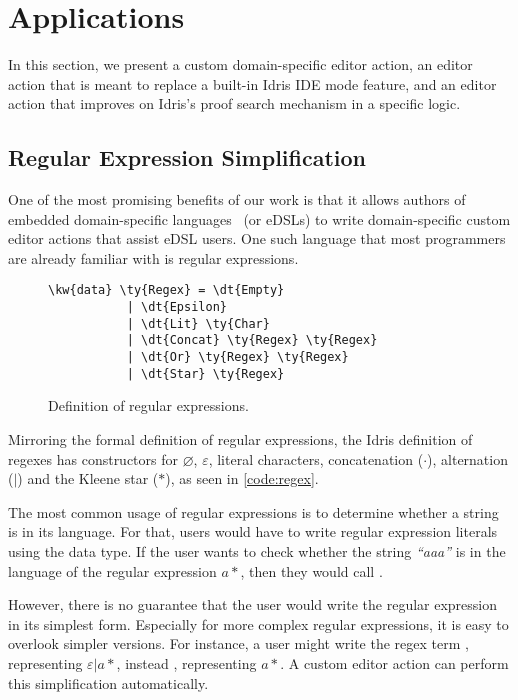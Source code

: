 \section{Applications} \label{sec:applications}

In this section, we present a custom domain-specific editor action, an editor
action that is meant to replace a built-in Idris IDE mode feature, and an
editor action that improves on Idris's proof search mechanism in a specific
logic.

\subsection{Regular Expression Simplification}

One of the most promising benefits of our work is that it allows authors of
embedded domain-specific languages~\cite{dsel} (or eDSLs) to write domain-specific
custom editor actions that assist eDSL users.
One such language that most programmers are already familiar with is regular
expressions.

\begin{figure}[ht]
\begin{Verbatim}
\kw{data} \ty{Regex} = \dt{Empty}
           | \dt{Epsilon}
           | \dt{Lit} \ty{Char}
           | \dt{Concat} \ty{Regex} \ty{Regex}
           | \dt{Or} \ty{Regex} \ty{Regex}
           | \dt{Star} \ty{Regex}
\end{Verbatim}
\caption{Definition of regular expressions.}
\label{code:regex}
\end{figure}

Mirroring the formal definition of regular expressions, the Idris definition of
regexes has constructors for $\varnothing$, $\varepsilon$, literal
characters, concatenation ($\cdot$), alternation ($|$) and the Kleene star ($*$),
as seen in \autoref{code:regex}.

The most common usage of regular expressions is to determine whether a string is in its language.
For that, users would have to write regular expression literals using the
 data type. If the user wants to check whether the string \textit{``aaa''} is in
the language of the regular expression $a*$, then they would call
.

However, there is no guarantee that the user would write the regular expression
in its simplest form. Especially for more complex regular expressions, it is
easy to overlook simpler versions. For instance, a user might write the regex
term , representing
$\varepsilon | a*$, instead , representing $a*$.
A custom editor action can perform this simplification automatically.

